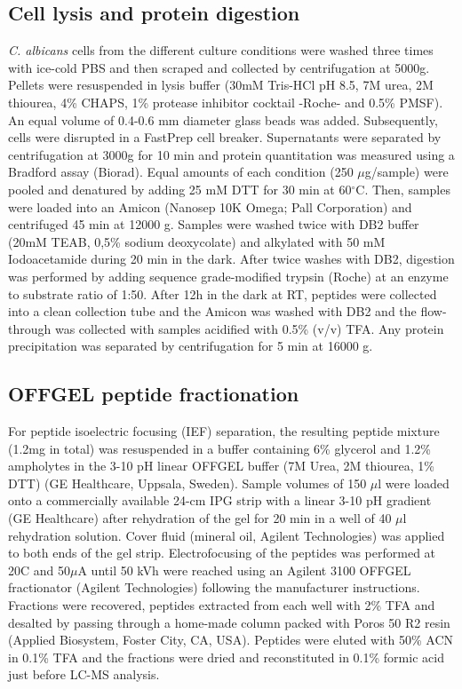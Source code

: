 \subsection*{Cell lysis and protein digestion}

\textit{C. albicans} cells from the different culture conditions were washed three times with ice-cold
PBS and then scraped and collected by centrifugation at 5000g. Pellets were resuspended in
lysis buffer (30mM Tris-HCl pH 8.5, 7M urea, 2M thiourea, 4\% CHAPS, 1\% protease inhibitor
cocktail -Roche- and 0.5\% PMSF). An equal volume of 0.4-0.6 mm diameter glass beads
was added. Subsequently, cells were disrupted in a FastPrep cell breaker. Supernatants
were separated by centrifugation at 3000g for 10 min and protein quantitation was measured
using a Bradford assay (Biorad).
Equal amounts of each condition (250 $\mu$g/sample) were pooled and denatured by adding 25
mM DTT for 30 min at 60$^{\circ}$C. Then, samples were loaded into an Amicon (Nanosep 10K
Omega; Pall Corporation) and centrifuged 45 min at 12000 g. Samples were washed twice
with DB2 buffer (20mM TEAB, 0,5\% sodium deoxycolate) and alkylated with 50 mM
Iodoacetamide during 20 min in the dark. After twice washes with DB2, digestion was
performed by adding sequence grade-modified trypsin (Roche) at an enzyme to substrate
ratio of 1:50. After 12h in the dark at RT, peptides were collected into a clean collection tube
and the Amicon was washed with DB2 and the flow-through was collected with samples
acidified with 0.5\% (v/v) TFA. Any protein precipitation was separated by centrifugation for 5
min at 16000 g.


\subsection*{OFFGEL peptide fractionation}

For peptide isoelectric focusing (IEF) separation, the resulting peptide mixture (1.2mg in
total) was resuspended in a buffer containing 6\% glycerol and 1.2\% ampholytes in the 3-10
pH linear OFFGEL buffer (7M Urea, 2M thiourea, 1\% DTT) (GE Healthcare, Uppsala,
Sweden). Sample volumes of 150  $\mu$l were loaded onto a commercially available 24-cm IPG
strip with a linear 3-10 pH gradient (GE Healthcare) after rehydration of the gel for 20 min in
a well of 40 $\mu$l rehydration solution. Cover fluid (mineral oil, Agilent Technologies) was applied
to both ends of the gel strip. Electrofocusing of the peptides was performed at 20C and 50$\mu$A 
until 50 kVh were reached using an Agilent 3100 OFFGEL fractionator (Agilent
Technologies) following the manufacturer instructions. Fractions were recovered, peptides
extracted from each well with 2\% TFA and desalted by passing through a home-made
column packed with Poros 50 R2 resin (Applied Biosystem, Foster City, CA, USA). Peptides
were eluted with 50\% ACN in 0.1\% TFA and the fractions were dried and reconstituted in
0.1\% formic acid just before LC-MS analysis.



